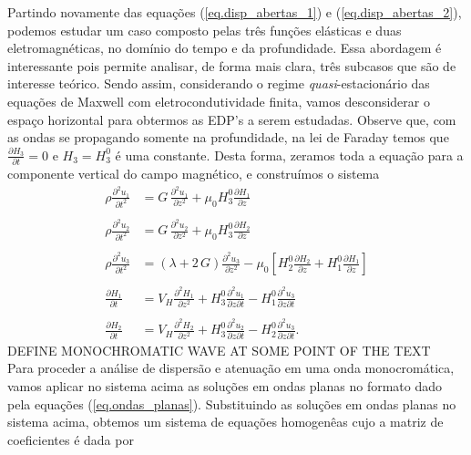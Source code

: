Partindo novamente das equa\c{c}\~oes (\ref{eq.disp_abertas_1}) e (\ref{eq.disp_abertas_2}), podemos estudar um caso composto pelas tr\^es fun\c{c}\~oes el\'asticas e duas eletromagn\'eticas, no dom\'inio do tempo e da profundidade. Essa abordagem \'e interessante pois permite analisar, de forma mais clara,  tr\^es subcasos que s\~ao de interesse te\'orico. Sendo assim, considerando o regime \textit{quasi}-estacion\'ario das equa\c{c}\~oes de Maxwell com eletrocondutividade finita, vamos desconsiderar  o espa\c{c}o horizontal para obtermos as EDP's a serem estudadas. Observe que, com as ondas se propagando somente na profundidade, na lei de Faraday temos que $\frac{\partial H_3}{\partial t}=0$ e $H_3=H_3^0$ \'e uma constante. Desta forma, zeramos toda a equa\c{c}\~ao para a componente vertical do campo magn\'etico, e constru\'imos o sistema 
\begin{align}\label{eq.u1_time}
\rho\frac{\partial^2 u_1}{\partial t^2}&=G\,\frac{\partial^2 u_1}{\partial z^2}+\mu_0H_3^0\frac{\partial H_1}{\partial z}\\\nonumber\\\label{eq.u2_time}
\rho\frac{\partial^2 u_2}{\partial t^2}&=G\,\frac{\partial^2 u_2}{\partial z^2}+\mu_0H_3^0\frac{\partial H_2}{\partial z}\\\nonumber\\\label{eq.u3_time}
\rho\frac{\partial^2 u_3}{\partial t^2}&=(\lambda+2\,G)\frac{\partial^2 u_3}{\partial z^2}-\mu_0\left[H_2^0\frac{\partial H_2}{\partial z}+H_1^0\frac{\partial H_1}{\partial z} \right]\\\nonumber\\\label{eq.H1_time}
\frac{\partial H_1}{\partial t}&=V_H\frac{\partial^2 H_1}{\partial z^2}+H_3^0\frac{\partial^2 u_1}{\partial z\partial t}-H_1^0\frac{\partial^2 u_3}{\partial z\partial t}\\\nonumber\\\label{eq.H2_time}
\frac{\partial H_2}{\partial t}&=V_H\frac{\partial^2 H_2}{\partial z^2}+H_3^0\frac{\partial^2 u_2}{\partial z\partial t}-H_2^0\frac{\partial^2 u_3}{\partial z\partial t}.
\end{align}
DEFINE MONOCHROMATIC WAVE AT SOME POINT OF THE TEXT\\
Para proceder a an\'alise de dispers\~ao e atenua\c{c}\~ao em uma onda monocrom\'atica, vamos aplicar no sistema acima as solu\c{c}\~oes em ondas planas no formato dado pela equa\c{c}\~oes (\ref{eq.ondas_planas}). Substituindo as solu\c{c}\~oes em ondas planas no sistema acima, obtemos um sistema de equa\c{c}\~oes homogen\^eas cujo a matriz de coeficientes \'e dada por
